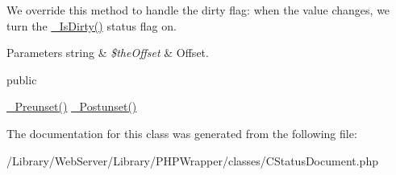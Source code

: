 We override this method to handle the dirty flag\-: when the value changes, we turn the \hyperlink{class_c_status_document_ad5193995e1bff6de09acf3248a232ef9}{\-\_\-\-Is\-Dirty()} status flag on.


\begin{DoxyParams}[1]{Parameters}
string & {\em \$the\-Offset} & Offset.\\
\hline
\end{DoxyParams}
public

\hyperlink{class_c_status_document_a9507e9159eb7fc1b2a0965d1fd267fa8}{\-\_\-\-Preunset()}  \hyperlink{class_c_status_document_a0022e449834b628db7f5f75698adb57d}{\-\_\-\-Postunset()} 

The documentation for this class was generated from the following file\-:\begin{DoxyCompactItemize}
\item 
/\-Library/\-Web\-Server/\-Library/\-P\-H\-P\-Wrapper/classes/C\-Status\-Document.\-php\end{DoxyCompactItemize}
